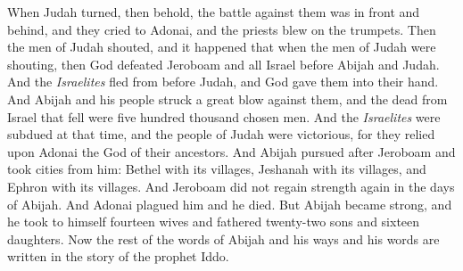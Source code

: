 \begin{biblechapter}
\verse When Judah turned, then behold, the battle against them was in front and behind, and they cried to Adonai, and the priests blew on the trumpets.
\verse Then the men of Judah shouted, and it happened that when the men of Judah were shouting, then God defeated Jeroboam and all Israel before Abijah and Judah.
\verse And the \textit{Israelites} fled from before Judah, and God gave them into their hand.
\verse And Abijah and his people struck a great blow against them, and the dead from Israel that fell were five hundred thousand chosen men.
\verse And the \textit{Israelites} were subdued at that time, and the people of Judah were victorious, for they relied upon Adonai the God of their ancestors.
\verse And Abijah pursued after Jeroboam and took cities from him: Bethel with its villages, Jeshanah with its villages, and Ephron with its villages.
\verse And Jeroboam did not regain strength again in the days of Abijah. And Adonai plagued him and he died.
\verse But Abijah became strong, and he took to himself fourteen wives and fathered twenty-two sons and sixteen daughters.
\verse Now the rest of the words of Abijah and his ways and his words are written in the story of the prophet Iddo.
\end{biblechapter}

